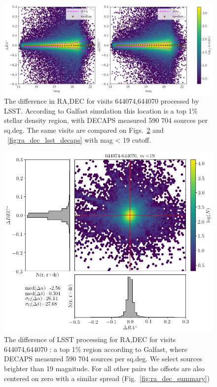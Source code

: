 \documentclass[DM,lsstdraft,toc,usenatbib,authoryear]{lsstdoc}
\begin{document}
\begin{figure}
\begin{centering}
\includegraphics[width=1.0\columnwidth]{figs/644074-644070_dra_ddec_mag.png}
\caption{The difference in RA,DEC for visits 644074,644070 processed by LSST. According to Galfast simulation this location is a top 1\% stellar density region, with DECAPS measured 590 704 sources per sq.deg. The same visits are compared on Figs.~\ref{fig:ra_dec_lsst_lsst} and ~\ref{fig:ra_dec_lsst_decaps} with mag < 19 cutoff. }
\label{fig:ra_dec_mag}
\end{centering}
\end{figure}



\begin{figure}
\begin{centering}
\includegraphics[width=0.8\columnwidth]{figs/lsst644074-644070_RA_DEC_offset_lims.png}
\caption{The difference of LSST processing for  RA,DEC for visits 644074,644070 : a top 1\% region according to Galfast, where DECAPS measured 590 704 sources per sq.deg. We select sources brighter than 19 magnitude.  For all other pairs the  offsets are also centered on zero with a similar spread (Fig.~\ref{fig:ra_dec_summary})}
\label{fig:ra_dec_lsst_lsst}
\end{centering}
\end{figure}
\end{document}
